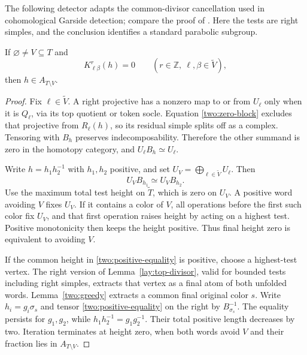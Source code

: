 The following detector adapts the common-divisor cancellation used in
cohomological Garside detection; compare the proof of
\cite[Theorem~3.1]{BravThomas2011}.  Here the tests are right simples,
and the conclusion identifies a standard parabolic subgroup.

\begin{lemma}
\label{two:detection}
If $\varnothing\ne V\subseteq T$ and
\begin{equation}
 K^r_{\ell\beta}(h)=0
 \qquad(r\in\mathbb Z,\ \ell,\beta\in\widetilde V),
 \label{two:zero-block}
\end{equation}
then $h\in A_{T\setminus V}$.
\end{lemma}
\begin{proof}
Fix $\ell\in\widetilde V$.  A right projective has a nonzero map
to or from $U_\ell$ only when it is $Q_\ell$, via its top quotient
or token socle.  Equation \eqref{two:zero-block} excludes that
projective from $R_\ell(h)$, so its residual simple splits off as
a complex.  Tensoring with $B_h$ preserves indecomposability.
Therefore the other summand is zero in the homotopy category, and
$U_\ell B_h\simeq U_\ell$.

Write $h=h_1h_2^{-1}$ with $h_1,h_2$ positive, and set
$U_V=\bigoplus_{\ell\in\widetilde V}U_\ell$.  Then
\begin{equation}
 U_VB_{h_1}\simeq U_VB_{h_2}.
 \label{two:positive-equality}
\end{equation}
Use the maximum total test height on $\widetilde T$, which is zero
on $U_V$.  A positive word avoiding $V$ fixes $U_V$.  If it contains
a color of $V$, all operations before the first such color fix
$U_V$, and that first operation raises height by acting on a
highest test.  Positive monotonicity then keeps the height positive.
Thus final height zero is equivalent to avoiding $V$.

If the common height in \eqref{two:positive-equality} is positive,
choose a highest-test vertex.  The right version of
Lemma~\ref{lay:top-divisor}, valid for bounded tests including right
simples, extracts that vertex as a final atom of both unfolded
words.  Lemma~\ref{two:greedy} extracts a common final original
color $s$.  Write $h_i=g_i\sigma_s$ and tensor
\eqref{two:positive-equality} on the right by $B_{\sigma_s}^{-1}$.
The equality persists for $g_1,g_2$, while
$h_1h_2^{-1}=g_1g_2^{-1}$.  Their total positive length decreases
by two.  Iteration terminates at height zero, when both words avoid
$V$ and their fraction lies in $A_{T\setminus V}$.
\end{proof}

